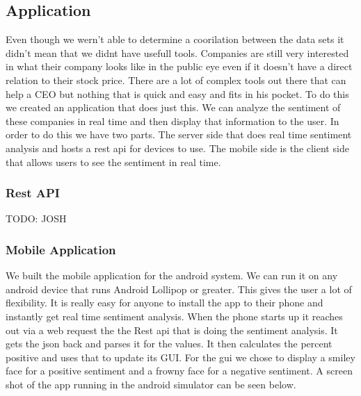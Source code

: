\documentclass{acm_proc_article-sp}
\begin{document}
\subsection{Application}

Even though we wern't able to determine a coorilation between the data sets it
didn't mean that we didnt have usefull tools. Companies are still very
interested in what their company looks like in the public eye even if it
doesn't have a direct relation to their stock price. There are a lot of complex
tools out there that can help a CEO but nothing that is quick and easy and fits
in his pocket. To do this we created an application that does just this. We can
analyze the sentiment of these companies in real time and then display that
information to the user. In order to do this we have two parts. The server side
that does real time sentiment analysis and hosts a rest api for devices to use.
The mobile side is the client side that allows users to see the sentiment in
real time.

\subsubsection{Rest API}
TODO: JOSH

\subsubsection{Mobile Application}

We built the mobile application for the android system. We can run it on any
android device that runs Android Lollipop or greater. This gives the user a lot
of flexibility. It is really easy for anyone to install the app to their phone
and instantly get real time sentiment analysis. When the phone starts up it
reaches out via a web request the the Rest api that is doing the sentiment
analysis. It gets the json back and parses it for the values. It then
calculates the percent positive and uses that to update its GUI. For the gui we
chose to display a smiley face for a positive sentiment and a frowny face for a
negative sentiment. A screen shot of the app running in the android simulator
can be seen below.  

\break
\end{document}
